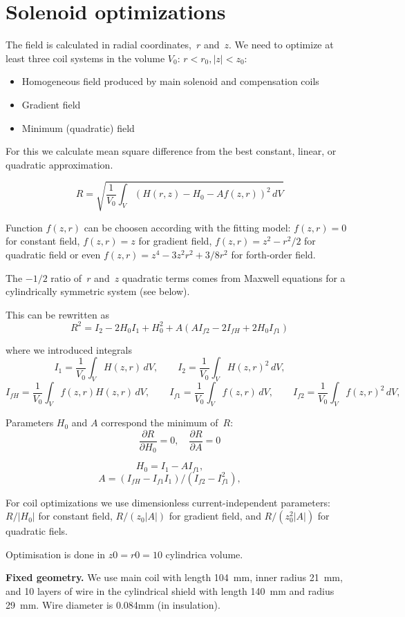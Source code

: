 \documentclass[a4paper]{article}
\begin{document}
\section {Solenoid optimizations}

The field is calculated in radial coordinates,~$r$ and~$z$.
We need to optimize at least three coil systems in the volume $V_0$: $r<r_0, |z|<z_0$:
\begin{itemize}
\item Homogeneous field produced by main solenoid and compensation coils
\item Gradient field
\item Minimum (quadratic) field
\end{itemize}
For this we calculate mean square difference from the best
constant, linear, or quadratic approximation.

$$ R = \sqrt{\frac{1}{V_0}\int_V(H(r,z) - H_0 - A f(z,r))^2\,dV}
$$

Function $f(z,r)$ can be choosen according with the fitting model:
$f(z,r)=0$ for constant field, $f(z,r)=z$ for gradient field, 
$f(z,r)=z^2-r^2/2$ for quadratic field or even $f(z,r) = z^4 - 3z^2r^2 + 3/8r^2$
for forth-order field.

The $-1/2$ ratio of~$r$ and~$z$ quadratic terms comes from Maxwell equations
for a cylindrically symmetric system (see below).


This can be rewritten as
$$ R^2
 = I_2 - 2H_0 I_1 + H_0^2 + A( A I_{f2} - 2I_{fH} + 2H_0 I_{f1})
$$



where we introduced integrals
$$
I_1 = \frac{1}{V_0}\int_V H(z,r)\, dV,\qquad
I_2 = \frac{1}{V_0}\int_V H(z,r)^2\, dV,\qquad
$$
$$
I_{fH} = \frac{1}{V_0}\int_V f(z,r) H(z,r)\, dV,\qquad
I_{f1} = \frac{1}{V_0}\int_V f(z,r)  \, dV,\qquad
I_{f2} = \frac{1}{V_0}\int_V f(z,r)^2\, dV,\qquad
$$

Parameters $H_0$ and $A$ correspond the minimum of~$R$:
$$
\frac{\partial R}{\partial H_0} = 0,\quad
\frac{\partial R}{\partial A} = 0
$$

$$
H_0 = I_1 - A I_{f1},\qquad
$$
$$
A = (I_{fH} - I_{f1} I_1)/(I_{f2} - I_{f1}^2),\qquad
$$

For coil optimizations we use dimensionless current-independent
parameters:
$R/|H_0|$ for constant field, $R/(z_0|A|)$ for gradient field, and
$R/(z_0^2|A|)$ for quadratic fiels.

Optimisation is done in $z0=r0=10$ cylindrica volume.

{\bf Fixed geometry.} We use main coil with length 104~mm, inner radius
21~mm, and 10 layers of wire in the cylindrical shield with length 140~mm
and radius 29~mm. Wire diameter is 0.084mm (in insulation).
\end{document}
